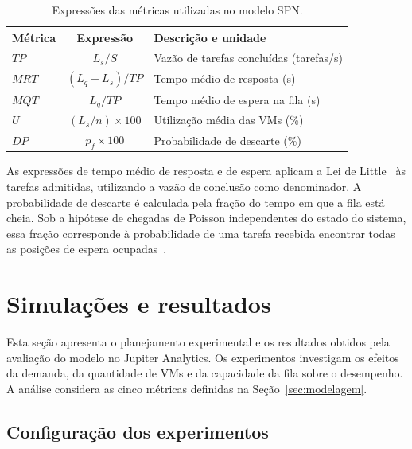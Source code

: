 \documentclass[conference]{IEEEtran}
\begin{document}
\begin{table}[!t]
    \caption{Expressões das métricas utilizadas no modelo SPN.}
    \label{tab:metricas}
    \centering
    \footnotesize
    \renewcommand{\arraystretch}{1.4}
    \begin{tabularx}{\columnwidth}{@{}l c X@{}}
        \hline
        \textbf{Métrica} & \textbf{Expressão}
        & \textbf{Descrição e unidade} \\
        \hline
        $TP$ & $L_s/S$
        & Vazão de tarefas concluídas (tarefas/s) \\

        $MRT$ & $(L_q+L_s)/TP$
        & Tempo médio de resposta (s) \\

        $MQT$ & $L_q/TP$
        & Tempo médio de espera na fila (s) \\

        $U$ & $(L_s/n)\times 100$
        & Utilização média das VMs (\%) \\

        $DP$ & $p_f\times 100$
        & Probabilidade de descarte (\%) \\
        \hline
    \end{tabularx}
\end{table}

As expressões de tempo médio de resposta e de espera
aplicam a Lei de Little~\cite{little1961proof} às tarefas admitidas, utilizando
a vazão de conclusão como denominador. A probabilidade
de descarte é calculada pela fração do tempo em que
a fila está cheia. Sob a hipótese de chegadas de
Poisson independentes do estado do sistema, essa
fração corresponde à probabilidade de uma tarefa
recebida encontrar todas as posições de espera ocupadas~\cite{wolff1982poisson}.


\section{Simulações e resultados}
\label{sec:resultados}

Esta seção apresenta o planejamento experimental e os
resultados obtidos pela avaliação do modelo no Jupiter
Analytics. Os experimentos investigam os efeitos da demanda,
da quantidade de VMs e da capacidade da fila sobre o
desempenho. A análise considera as cinco métricas definidas
na Seção~\ref{sec:modelagem}.

\subsection{Configuração dos experimentos}
\end{document}
